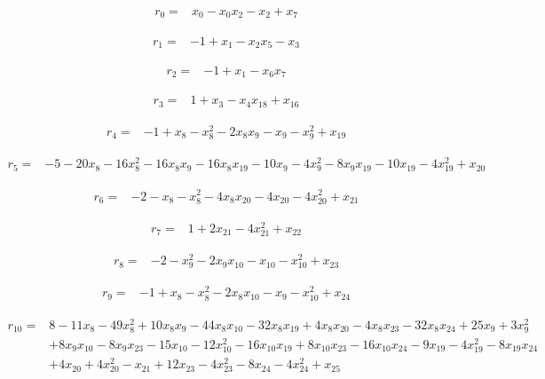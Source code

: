 \begingroup\small\allowdisplaybreaks[4]
\begin{align*}
r_{0}={}&x_{0}-x_{0}x_{2}-x_{2}+x_{7}
\end{align*}

\begin{align*}
r_{1}={}&-1+x_{1}-x_{2}x_{5}-x_{3}
\end{align*}

\begin{align*}
r_{2}={}&-1+x_{1}-x_{6}x_{7}
\end{align*}

\begin{align*}
r_{3}={}&1+x_{3}-x_{4}x_{18}+x_{16}
\end{align*}

\begin{align*}
r_{4}={}&-1+x_{8}-x_{8}^{2}-2x_{8}x_{9}-x_{9}-x_{9}^{2}+x_{19}
\end{align*}

\begin{align*}
r_{5}={}&-5-20x_{8}-16x_{8}^{2}-16x_{8}x_{9}-16x_{8}x_{19}-10x_{9}-4x_{9}^{2}-8x_{9}x_{19}-10x_{19}-4x_{19}^{2}+x_{20}
\end{align*}

\begin{align*}
r_{6}={}&-2-x_{8}-x_{8}^{2}-4x_{8}x_{20}-4x_{20}-4x_{20}^{2}+x_{21}
\end{align*}

\begin{align*}
r_{7}={}&1+2x_{21}-4x_{21}^{2}+x_{22}
\end{align*}

\begin{align*}
r_{8}={}&-2-x_{9}^{2}-2x_{9}x_{10}-x_{10}-x_{10}^{2}+x_{23}
\end{align*}

\begin{align*}
r_{9}={}&-1+x_{8}-x_{8}^{2}-2x_{8}x_{10}-x_{9}-x_{10}^{2}+x_{24}
\end{align*}

\begin{align*}
r_{10}={}&8-11x_{8}-49x_{8}^{2}+10x_{8}x_{9}-44x_{8}x_{10}-32x_{8}x_{19}+4x_{8}x_{20}-4x_{8}x_{23}-32x_{8}x_{24}+25x_{9}+3x_{9}^{2}\\
&+8x_{9}x_{10}-8x_{9}x_{23}-15x_{10}-12x_{10}^{2}-16x_{10}x_{19}+8x_{10}x_{23}-16x_{10}x_{24}-9x_{19}-4x_{19}^{2}-8x_{19}x_{24}\\
&+4x_{20}+4x_{20}^{2}-x_{21}+12x_{23}-4x_{23}^{2}-8x_{24}-4x_{24}^{2}+x_{25}
\end{align*}


